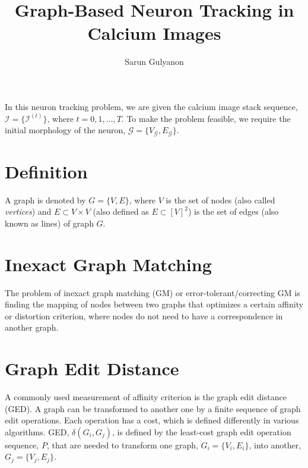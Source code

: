 \documentclass[10pt,letterpaper]{article}
\author{Sarun Gulyanon}
\title{Graph-Based Neuron Tracking in Calcium Images}
\begin{document}
\maketitle



In this neuron tracking problem, we are given the calcium image stack sequence, $\mathcal{I} = \{ \mathcal{I}^{(t)} \}$, where $t = 0,1,\dots,T$. To make the problem feasible, we require the initial morphology of the neuron, $\mathcal{G} = \{ V_\mathcal{G}, E_\mathcal{G} \}$.

\section{Definition}
A graph is denoted by $G = \{V, E\}$, where $V$ is the set of nodes (also called \emph{vertices}) and $E \subset V \times V$ (also defined as $E \subset [V]^2$) is the set of edges (also known as lines) of graph $G$. 

\section{Inexact Graph Matching}
The problem of inexact graph matching (GM) or error-tolerant/correcting GM is finding the mapping of nodes between two graphs that optimizes a certain affinity or distortion criterion, where nodes do not need to have a correspondence in another graph.

\section{Graph Edit Distance}
A commonly used measurement of affinity criterion is the graph edit distance (GED). A graph can be transformed to another one by a finite sequence of graph edit operations. Each operation has a cost, which is defined differently in various algorithms. GED, $\delta (G_i, G_j)$, is defined by the least-cost graph edit operation sequence, $P$, that are needed to transform one graph, $G_i = \{V_i, E_i\}$, into another, $G_j = \{V_j, E_j\}$.
\end{document}
